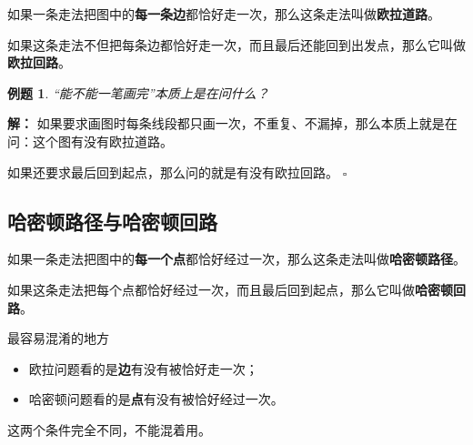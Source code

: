 \documentclass[11pt,a4paper,fontset=fandol]{ctexart}
\theoremstyle{formaltheorem}
\theoremstyle{formalexample}
\newtheorem{example}{例题}[section]
\newenvironment{solution}{\par\noindent\textbf{解：}}{\hfill$\square$\par}
\begin{document}
如果一条走法把图中的\textbf{每一条边}都恰好走一次，那么这条走法叫做\textbf{欧拉道路}。

如果这条走法不但把每条边都恰好走一次，而且最后还能回到出发点，那么它叫做\textbf{欧拉回路}。

\begin{example}
“能不能一笔画完”本质上是在问什么？
\end{example}

\begin{solution}
如果要求画图时每条线段都只画一次，不重复、不漏掉，那么本质上就是在问：这个图有没有欧拉道路。

如果还要求最后回到起点，那么问的就是有没有欧拉回路。
\end{solution}

\subsection{哈密顿路径与哈密顿回路}

如果一条走法把图中的\textbf{每一个点}都恰好经过一次，那么这条走法叫做\textbf{哈密顿路径}。

如果这条走法把每个点都恰好经过一次，而且最后回到起点，那么它叫做\textbf{哈密顿回路}。

\begin{notebox}{最容易混淆的地方}
\begin{itemize}
  \item 欧拉问题看的是\textbf{边}有没有被恰好走一次；
  \item 哈密顿问题看的是\textbf{点}有没有被恰好经过一次。
\end{itemize}
这两个条件完全不同，不能混着用。
\end{notebox}
\end{document}
